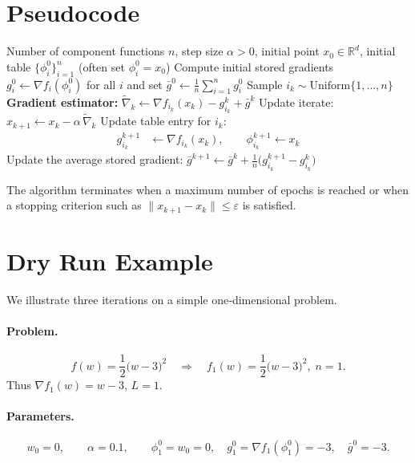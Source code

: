 \documentclass{article}
\begin{document}
\section{Pseudocode}
\begin{algorithm}[H]
\caption{SAGA}
\label{alg:saga}
\begin{algorithmic}[1]
\Require Number of component functions $n$, step size $\alpha>0$, 
initial point $x_0\in\mathbb{R}^d$, initial table $\{\phi_i^0\}_{i=1}^n$ (often set $\phi_i^0=x_0$)
\State Compute initial stored gradients $g_i^0\gets\nabla f_i(\phi_i^0)$ for all $i$ and set $\bar g^0\gets\frac1n\sum_{i=1}^n g_i^0$
    \State Sample $i_k\sim\text{Uniform}\{1,\dots,n\}$
    \State \textbf{Gradient estimator:}\;
          $\displaystyle \tilde\nabla_k
          \gets \nabla f_{i_k}(x_k)-g_{i_k}^k+\bar g^k$
    \State Update iterate: $x_{k+1}\gets x_k-\alpha\,\tilde\nabla_k$ \label{line:update}
    \State Update table entry for $i_k$:
          \begin{align*}
          g_{i_k}^{k+1}&\gets \nabla f_{i_k}(x_k),\qquad 
          \phi_{i_k}^{k+1}\gets x_k
          \end{align*}
    \State Update the average stored gradient:
          $\displaystyle \bar g^{k+1}\gets \bar g^{k}
          +\frac{1}{n}\bigl(g_{i_k}^{k+1}-g_{i_k}^{k}\bigr)$
\EndFor
\end{algorithmic}
\end{algorithm}

The algorithm terminates when a maximum number of epochs is reached or when a stopping criterion such as $\|x_{k+1}-x_k\|\le\varepsilon$ is satisfied.

\section{Dry Run Example}
We illustrate three iterations on a simple one‑dimensional problem.

\paragraph{Problem.}
\[
f(w)=\frac{1}{2}\bigl(w-3\bigr)^2
\quad\Longrightarrow\quad 
f_1(w)=\frac{1}{2}\bigl(w-3\bigr)^2,\; n=1.
\]
Thus $\nabla f_1(w)=w-3$, $L=1$.

\paragraph{Parameters.}
\[
w_0=0,\qquad\alpha=0.1,\qquad 
\phi_1^0=w_0=0,\quad g_1^0=\nabla f_1(\phi_1^0)=-3,\quad \bar g^0=-3.
\]
\end{document}

